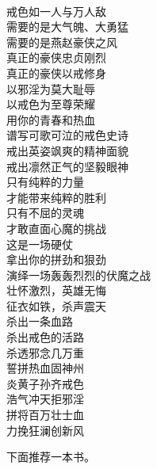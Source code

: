 \begin{poem}[杀出重围]
    \begin{multicols}{2}
        \begin{center}~\\
            戒色如一人与万人敌 \\ 需要的是大气魄、大勇猛 \\ 需要的是燕赵豪侠之风 \\ 真正的豪侠忠贞刚烈 \\ 真正的豪侠以戒修身 \\ 以邪淫为莫大耻辱 \\ 以戒色为至尊荣耀 \\ 用你的青春和热血 \\ 谱写可歌可泣的戒色史诗 \\ 戒出英姿飒爽的精神面貌 \\ 戒出凛然正气的坚毅眼神 \\ 只有纯粹的力量 \\ 才能带来纯粹的胜利 \\ 只有不屈的灵魂 \\ 才敢直面心魔的挑战 \\ 这是一场硬仗 \\ 拿出你的拼劲和狠劲 \\ 演绎一场轰轰烈烈的伏魔之战 \\ 壮怀激烈，英雄无悔 \\ 征衣如铁，杀声震天 \\ 杀出一条血路 \\ 杀出戒色的活路 \\ 杀透邪念几万重 \\ 誓拼热血固神州 \\ 炎黄子孙齐戒色 \\ 浩气冲天拒邪淫 \\ 拼将百万壮士血 \\ 力挽狂澜创新风
        \end{center}
    \end{multicols}
\end{poem}

下面推荐一本书。

